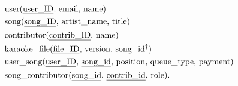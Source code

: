 \documentclass{report}
\title{\Huge{}}
\author{\huge{Nathan Warner}}
\date{\huge{}}
\begin{document}
    \tableofcontents
    \pagebreak 
    \begin{align*}
        &\text{user(\underline{user\_ID}, email, name)} \\
        &\text{song(\underline{song\_ID}, artist\_name, title)} \\
        &\text{contributor(\underline{contrib\_ID}, name)} \\
        &\text{karaoke\_file(\underline{file\_ID}, version, song\_id$^{\dag}$)} \\
        &\text{user\_song(\underline{user\_ID}, \underline{song\_id}, position, queue\_type, payment)} \\
        &\text{song\_contributor(\underline{song\_id}, \underline{contrib\_id}, role)}
    .\end{align*}



    
\end{document}
